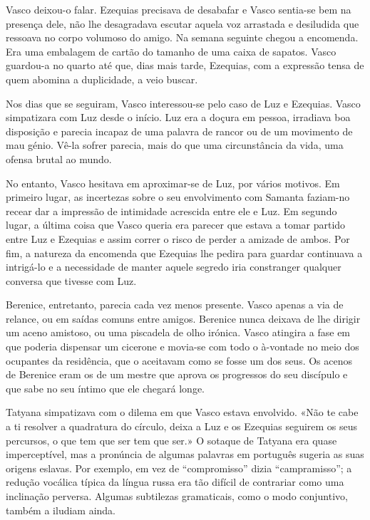 Vasco
deixou-o falar. Ezequias precisava de desabafar e Vasco sentia-se bem na
presença dele, não lhe desagradava escutar aquela voz arrastada e
desiludida que ressoava no corpo volumoso do amigo. Na semana seguinte
chegou a encomenda. Era uma embalagem de cartão do tamanho de uma
caixa de sapatos. Vasco guardou-a no quarto até que, dias mais tarde,
Ezequias, com a expressão tensa de quem abomina a duplicidade, a veio buscar.

Nos dias que se seguiram, Vasco interessou-se pelo caso de Luz e
Ezequias. Vasco simpatizara com Luz desde o início. Luz era a doçura em
pessoa, irradiava boa disposição e parecia incapaz de uma palavra de
rancor ou de um movimento de mau génio. Vê-la sofrer parecia, mais do
que uma circunstância da vida, uma ofensa brutal ao mundo.

No entanto, Vasco hesitava em aproximar-se de Luz, por vários motivos.
Em primeiro lugar, as incertezas sobre o seu envolvimento com Samanta
faziam-no recear dar a impressão de intimidade acrescida entre ele e
Luz. Em segundo lugar, a última coisa que Vasco queria era parecer que
estava a tomar partido entre Luz e Ezequias e assim correr o risco de
perder a amizade de ambos. Por fim, a natureza da encomenda que Ezequias
lhe pedira para guardar continuava a intrigá-lo e a
necessidade de manter aquele segredo iria constranger qualquer conversa
que tivesse com Luz.

Berenice, entretanto, parecia cada vez menos presente. Vasco apenas a
via de relance, ou em saídas comuns entre amigos. Berenice nunca deixava
de lhe dirigir um aceno amistoso, ou uma piscadela de olho irónica.
Vasco atingira a fase em que poderia dispensar um cicerone e movia-se
com todo o à-vontade no meio dos ocupantes da residência, que o aceitavam como se fosse um dos seus. Os acenos de Berenice eram os de um
mestre que aprova os progressos do seu discípulo e que sabe no seu
íntimo que ele chegará longe.

Tatyana simpatizava com o dilema em que Vasco estava envolvido. «Não te
cabe a ti resolver a quadratura do círculo, deixa a Luz e os Ezequias
seguirem os seus percursos, o que tem que ser tem que ser.» O sotaque de
Tatyana era quase imperceptível, mas a pronúncia de algumas palavras em
português sugeria as suas origens eslavas. Por exemplo, em vez de
``compromisso'' dizia ``campramisso''; a redução vocálica típica da
língua russa era tão difícil de contrariar como uma inclinação perversa.
Algumas subtilezas gramaticais, como o modo conjuntivo, também a iludiam
ainda.

